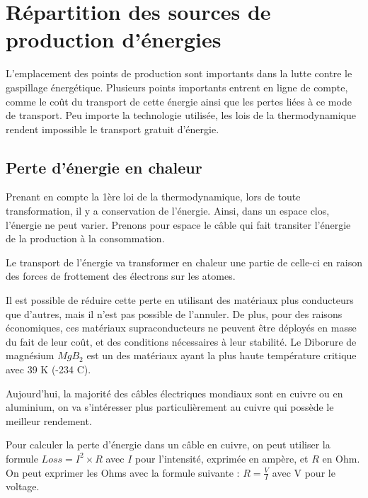 \chapter{Répartition des sources de production d'énergies}

L'emplacement des points de production sont importants dans la lutte contre le gaspillage énergétique.
Plusieurs points importants entrent en ligne de compte, comme le coût du transport de cette énergie ainsi que les pertes liées à ce mode de transport.
Peu importe la technologie utilisée, les lois de la thermodynamique rendent impossible le transport gratuit d'énergie.

\section{Perte d'énergie en chaleur}

Prenant en compte la 1ère loi de la thermodynamique, lors de toute transformation, il y a
conservation de l'énergie.
Ainsi, dans un espace clos, l'énergie ne peut varier.
Prenons pour espace le câble qui fait transiter l'énergie de la production à la consommation.

Le transport de l'énergie va transformer en chaleur une partie de celle-ci en raison
des forces de frottement des électrons sur les atomes.

Il est possible de réduire cette perte en utilisant des matériaux plus conducteurs que
d'autres, mais il n'est pas possible de l'annuler.
De plus, pour des raisons économiques, ces matériaux supraconducteurs ne peuvent être
déployés en masse du fait de leur coût, et des conditions nécessaires à leur stabilité.
Le Diborure de magnésium $MgB_2$ est un des matériaux ayant la plus haute température
critique avec 39 K (-234 C).

Aujourd'hui, la majorité des câbles électriques mondiaux sont en cuivre ou en aluminium,
on va s'intéresser plus particulièrement au cuivre qui possède le meilleur rendement.

Pour calculer la perte d'énergie dans un câble en cuivre, on peut utiliser la formule $Loss = I^2\times R$ avec $I$ pour l'intensité, exprimée en ampère, et $R$ en Ohm.
On peut exprimer les Ohms avec la formule suivante : $R = \frac{V}{I}$ avec V pour le voltage.

